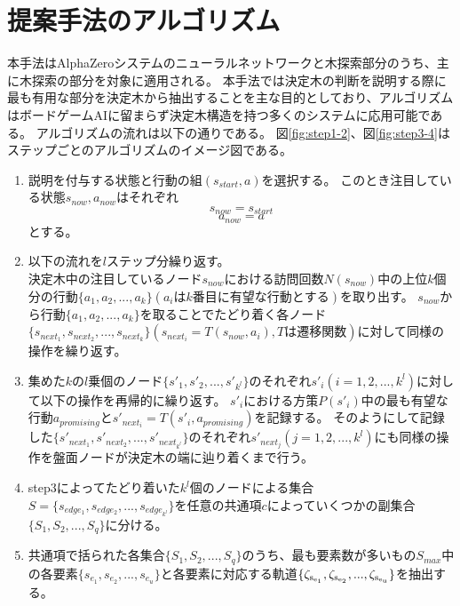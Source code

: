 \section{提案手法のアルゴリズム}
本手法はAlphaZeroシステムのニューラルネットワークと木探索部分のうち、主に木探索の部分を対象に適用される。
本手法では決定木の判断を説明する際に最も有用な部分を決定木から抽出することを主な目的としており、アルゴリズムはボードゲームAIに留まらず決定木構造を持つ多くのシステムに応用可能である。
アルゴリズムの流れは以下の通りである。
図\ref{fig:step1-2}、図\ref{fig:step3-4}はステップごとのアルゴリズムのイメージ図である。
\begin{enumerate}
    \item 説明を付与する状態と行動の組$(s_{start}, a)$を選択する。
    このとき注目している状態$s_{now}, a_{now}$はそれぞれ
    \begin{equation}
        {s_{now}=s_{start}}
    \end{equation}
    \begin{equation}
        {a_{now}=a}
    \end{equation}
    とする。
    \item 以下の流れを$l$ステップ分繰り返す。\\
    決定木中の注目しているノード$s_{now}$における訪問回数$N(s_{now})$中の上位$k$個分の行動$\{a_1, a_2, ..., a_{k}\}(a_iはk番目に有望な行動とする)$を取り出す。
    $s_{now}$から行動$\{a_1, a_2, ..., a_{k}\}$を取ることでたどり着く各ノード\\
    $\{s_{next_1}, s_{next_2}, ..., s_{next_{k}}\}(s_{next_i}=T(s_{now}, a_i), Tは遷移関数)$に対して同様の操作を繰り返す。
    
    
    \item 集めた$k$の$l$乗個のノード$\{{s}'_{1}, {s'}_{2}, ..., {s'}_{k^l}\}$のそれぞれ${s'}_{i}(i=1, 2, ..., k^l)$に対して以下の操作を再帰的に繰り返す。
    ${s'}_{i}$における方策$P({s'}_{i})$中の最も有望な行動$a_{promising}$と${s'}_{next_i}=T({s'}_i, a_{promising})$を記録する。
    そのようにして記録した$\{{s'}_{next_1}, {s'}_{next_2}, ..., {s'}_{next_{k^l}}\}$のそれぞれ${s'}_{next_j}(j=1, 2, ..., k^l)$にも同様の操作を盤面ノードが決定木の端に辿り着くまで行う。
    \item step3によってたどり着いた$k^l$個のノードによる集合$S=\{s_{edge_1}, s_{edge_2}, ..., s_{edge_{k^l}}\}$を任意の共通項$c$によっていくつかの副集合$\{S_1, S_2, ..., S_q\}$に分ける。
    \item 共通項で括られた各集合$\{S_1, S_2, ..., S_q\}$のうち、最も要素数が多いもの$S_{max}$中の各要素$\{s_{e_1}, s_{e_2}, ...,  s_{e_u}\}$と各要素に対応する軌道$\{\rm{{\zeta}_{s_{e_1}}}, \rm{{\zeta}_{s_{e_2}}}, ...,  \rm{{\zeta}_{s_{e_u}}}\}$を抽出する。
\end{enumerate}

